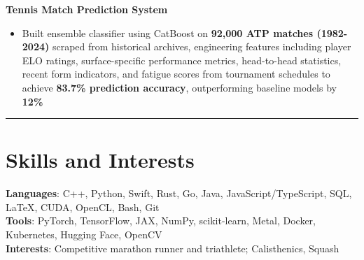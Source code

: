 \documentclass[11pt]{article}
\begin{document}
\vspace{3pt}
\noindent\textbf{Tennis Match Prediction System}
\begin{itemize}[leftmargin=*, topsep=1pt, itemsep=1pt, parsep=0pt]
\item Built ensemble classifier using CatBoost on \textbf{92,000 ATP matches (1982-2024)} scraped from historical archives, engineering features including player ELO ratings, surface-specific performance metrics, head-to-head statistics, recent form indicators, and fatigue scores from tournament schedules to achieve \textbf{83.7\% prediction accuracy}, outperforming baseline models by \textbf{12\%}
\end{itemize}

\noindent\rule{\textwidth}{0.5pt}

\section*{\textcolor{modernblue}{\Large Skills and Interests}}
\textbf{Languages}: C++, Python, Swift, Rust, Go, Java, JavaScript/TypeScript, SQL, LaTeX, CUDA, OpenCL, Bash, Git\\
\textbf{Tools}: PyTorch, TensorFlow, JAX, NumPy, scikit-learn, Metal, Docker, Kubernetes, Hugging Face, OpenCV\\
\textbf{Interests}: Competitive marathon runner and triathlete; Calisthenics, Squash
\end{document}
